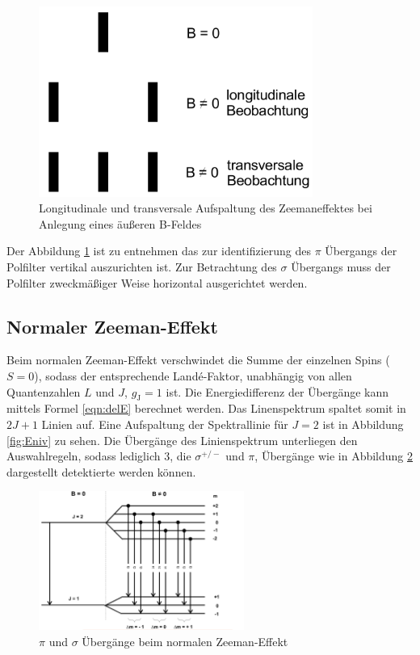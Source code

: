 \begin{figure}[H]
  \centering
  \includegraphics[width=0.8\textwidth]{./Bilder/Aufspaltung.png}
  \caption{Longitudinale und transversale Aufspaltung des Zeemaneffektes bei Anlegung eines äußeren B-Feldes \cite{V27}}
  \label{fig:aufZe}
\end{figure}
Der Abbildung \ref{fig:aufZe} ist zu entnehmen das zur identifizierung des $\pi$ Übergangs der Polfilter vertikal auszurichten ist. Zur Betrachtung des $\sigma$ Übergangs muss der Polfilter zweckmäßiger Weise horizontal ausgerichtet werden.

\subsection{Normaler Zeeman-Effekt}
Beim normalen Zeeman-Effekt verschwindet die Summe der einzelnen Spins ($S=0$), sodass der entsprechende Landé-Faktor, unabhängig von allen Quantenzahlen $L$ und $J$, $g_\text{J} = 1$ ist. Die Energiedifferenz der Übergänge kann mittels Formel \ref{eqn:delE} berechnet werden. Das Linenspektrum spaltet somit in $2 J + 1$ Linien auf. Eine Aufspaltung der Spektrallinie für $J = 2$ ist in Abbildung \ref{fig:Eniv} zu sehen.
Die Übergänge des Linienspektrum unterliegen den Auswahlregeln, sodass lediglich 3, die $\sigma^{+/-}$ und $\pi$, Übergänge wie in Abbildung \ref{fig:adf} dargestellt detektierte werden können.
\begin{figure}[H]
  \centering
  \includegraphics[width=0.6\textwidth]{./Bilder/asd.pdf}
  \caption{$\pi$ und $\sigma$ Übergänge beim normalen Zeeman-Effekt \cite{V27}}
  \label{fig:adf}
\end{figure}

